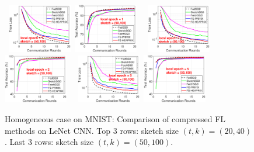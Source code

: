 \documentclass[sigconf, anonymous, review]{acmart}
\begin{document}
\begin{figure}[H]
\begin{center}
{		}
		\mbox{\hspace{-0.25in}	
		\includegraphics[width=0.25\textwidth]{MNIST_figures/local1_sketch50_iid1_train_loss.eps} \hspace{-0.12in}
		\includegraphics[width=0.25\textwidth]{MNIST_figures/local1_sketch50_iid1_test_acc.eps} 
		}
		\mbox{\hspace{-0.25in}	
		\includegraphics[width=0.25\textwidth]{MNIST_figures/local2_sketch50_iid1_train_loss.eps} \hspace{-0.12in}
		\includegraphics[width=0.25\textwidth]{MNIST_figures/local2_sketch50_iid1_test_acc.eps} 
		}
				\mbox{\hspace{-0.25in}		
		\includegraphics[width=0.25\textwidth]{MNIST_figures/local5_sketch50_iid1_train_loss.eps}\hspace{-0.12in}
		\includegraphics[width=0.25\textwidth]{MNIST_figures/local5_sketch50_iid1_test_acc.eps}
		}
	\end{center}
	
	\caption{Homogeneous case on MNIST: Comparison of compressed FL methods on LeNet CNN. Top 3 rows: sketch size $(t,k)=(20,40)$. Last 3 rows: sketch size $(t,k)=(50,100)$.}
    \label{fig:MNIST-iid1}
    
\end{figure}
\end{document}
